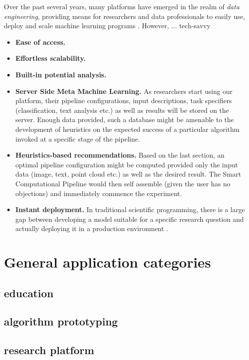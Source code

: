 Over the past several years, many platforms have emerged in the realm of \textit{data engineering}, providing means for researchers and data professionals to easily use, deploy and scale machine learning programs 
\cite{DataScienceTools2013}. However, ... tech-savvy


\begin{itemize}
	\item \textbf{Ease of access.}
	\item \textbf{Effortless scalability.}
	\item \textbf{Built-in potential analysis.}
	\item \textbf{Server Side Meta Machine Learning.} As researchers start using our platform, their pipeline configurations, input descriptions, task specifiers (classification, text analysis etc.) as well as results will be stored on the server. Enough data provided, such a database might be amenable to the development of heuristics on the expected success of a particular algorithm invoked at a specific stage of the pipeline.
	\item \textbf{Heuristics-based recommendations.} Based on the last section, an optimal pipeline configuration might be computed provided only the input data (image, text, point cloud etc.) as well as the desired result. The Smart Computational Pipeline would then self assemble (given the user has no objections) and immediately commence the experiment.
	\item \textbf{Instant deployment.} In traditional scientific programming, there is a large gap between developing a model suitable for a specific research question and actually deploying it in a production environment \citep{AnalLifecycle}.
\end{itemize}



\section{General application categories}
\label{sect:gen_app_cats}

\subsection{education}
\label{ssect:education}

\subsection{algorithm prototyping}
\label{ssect:algo_proto}

\subsection{research platform}
\label{ssect:research}

